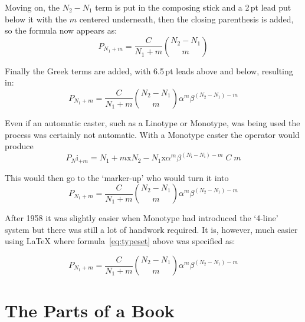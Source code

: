\documentclass[10pt,a4paper,oneside,extrafontsizes]{memoir}%
\newcommand\U[2]{\textrm{#1}\,\textrm{#2}}
\begin{document}
\begin{paracol}{2}
   Moving on, the $N_{2}-N_{1}$ term is put in the composing stick and a \U{2}{pt}
lead put below it with the $m$ centered underneath, then the closing parenthesis
is added, so the formula now appears as:
\begin{displaymath}
P_{N_1 + m} = \frac{C}{N_{1} + m} \binom{N_{2} - N_{1}}{m}
\end{displaymath}
 
    Finally the Greek terms are added, with \U{6.5}{pt} leads above and below, 
resulting in:
\begin{displaymath}
P_{N_1 + m} = \frac{C}{N_{1} + m} \binom{N_{2} - N_{1}}{m}
              \alpha^{m}\beta^{(N_{2}-N_{1}) - m}
\end{displaymath}

    Even if an automatic caster, such as a Linotype or Monotype, was being 
used the process was certainly not automatic. With a 
Monotype caster the 
operator would produce
\providecommand*{\tmri}{\mathrm{i}}
\providecommand*{\tmrx}{\mathrm{x}}
\begin{displaymath}
P_{N}\tmri_{+m} = N_{1} + m\tmrx N_{2}-N_{1}\tmrx \alpha^{m}\beta^{(N_{\tmri}-N_{\tmri}) - m} \; C \; m
\end{displaymath}

This would then go to the `marker-up' who would turn it into
\begin{displaymath}
P_{N_1 + m} = \frac{C}{N_{1} + m} \binom{N_{2} - N_{1}}{m}
              \alpha^{m}\beta^{(N_{2}-N_{1}) - m}
\end{displaymath}

After 1958 it was slightly easier when Monotype had introduced the 
`4-line' system but there was still a lot of handwork required. 
It is, however, much easier using LaTeX where 
formula~\ref{eq:typeset} above was specified as:
\begin{lcode}
\begin{equation}
P_{N_1 + m} = \frac{C}{N_{1} + m} \binom{N_{2} - N_{1}}{m}
              \alpha^{m}\beta^{(N_{2}-N_{1}) - m}
\end{equation}
\end{lcode}
\end{paracol}





\chapter{The Parts of a Book}
\end{document}
